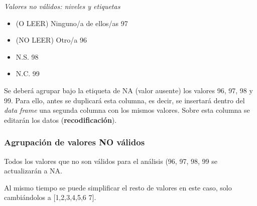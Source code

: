\documentclass[
  12 pt,
  a4paper,
]{article}
\newenvironment{Shaded}{\begin{snugshade}}{\end{snugshade}}
\newcommand{\AttributeTok}[1]{\textcolor[rgb]{0.13,0.29,0.53}{#1}}
\newcommand{\ConstantTok}[1]{\textcolor[rgb]{0.56,0.35,0.01}{#1}}
\newcommand{\DecValTok}[1]{\textcolor[rgb]{0.00,0.00,0.81}{#1}}
\newcommand{\FunctionTok}[1]{\textcolor[rgb]{0.13,0.29,0.53}{\textbf{#1}}}
\newcommand{\NormalTok}[1]{#1}
\newcommand{\OtherTok}[1]{\textcolor[rgb]{0.56,0.35,0.01}{#1}}
\newcommand{\SpecialCharTok}[1]{\textcolor[rgb]{0.81,0.36,0.00}{\textbf{#1}}}
\newcommand{\StringTok}[1]{\textcolor[rgb]{0.31,0.60,0.02}{#1}}
\providecommand{\tightlist}{%
  \setlength{\itemsep}{0pt}\setlength{\parskip}{0pt}}
\begin{document}
\emph{Valores no válidos: niveles y etiquetas}

\begin{itemize}
\tightlist
\item
  (O LEER) Ninguno/a de ellos/as 97
\item
  (NO LEER) Otro/a 96
\item
  N.S. 98
\item
  N.C. 99
\end{itemize}

Se deberá agrupar bajo la etiqueta de NA (valor ausente) los valores 96,
97, 98 y 99. Para ello, antes se duplicará esta columna, es decir, se
insertará dentro del \emph{data frame} una segunda columna con los
mismos valores. Sobre esta columna se editarán los datos
(\textbf{recodificación}).

\hypertarget{agrupaciuxf3n-de-valores-no-vuxe1lidos}{%
\subsubsection{Agrupación de valores NO
válidos}\label{agrupaciuxf3n-de-valores-no-vuxe1lidos}}

Todos los valores que no son válidos para el análisis (96, 97, 98, 99 se
actualizarán a NA.

Al mismo tiempo se puede simplificar el resto de valores en este caso,
solo cambiándolos a {[}1,2,3,4,5,6 7{]}.

\begin{Shaded}
\end{Shaded}
\end{document}
